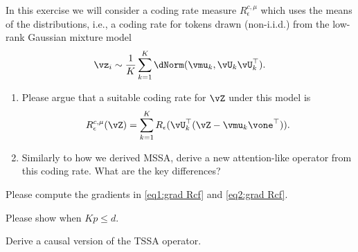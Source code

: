 \documentclass[../../book-main.tex]{subfiles}
\begin{document}
% 

\begin{exercise}
    In this exercise we will consider a coding rate measure
    \(R_{\epsilon}^{c, \mu}\) which uses the means of the
    distributions, i.e., a coding rate for tokens drawn (non-i.i.d.)
    from the low-rank Gaussian mixture model
    \begin{equation}
        \vz_{i} \sim \frac{1}{K}\sum_{k = 1}^{K}\dNorm(\vmu_{k},
        \vU_{k}\vU_{k}^{\top}).
    \end{equation}
    \begin{enumerate}
        \item Please argue that a suitable coding rate for \(\vZ\)
            under this model is
            \begin{equation}
                R_{\epsilon}^{c, \mu}(\vZ) = \sum_{k =
                1}^{K}R_{\epsilon}(\vU_{k}^{\top}(\vZ - \vmu_{k}\vone^{\top})).
            \end{equation}
        \item Similarly to how we derived MSSA, derive a new
            attention-like operator from this coding rate. What are
            the key differences?
    \end{enumerate}
\end{exercise}

\begin{exercise}
    Please compute the gradients in \eqref{eq1:grad Rcf} and
    \eqref{eq2:grad Rcf}.
\end{exercise}

\begin{exercise}
    Please show  when $Kp \le d$.
\end{exercise}

\begin{exercise}
    Derive a causal version of the TSSA operator.
\end{exercise}
\end{document}
